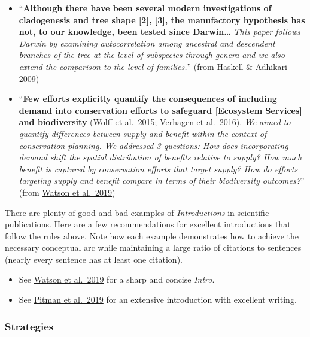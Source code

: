 \documentclass[
]{book}
\begin{document}
\begin{itemize}
\item
  ``\textbf{Although there have been several modern investigations of cladogenesis and tree shape {[}2{]}, {[}3{]}, the manufactory hypothesis has not, to our knowledge, been tested since Darwin\ldots{}} \emph{This paper follows Darwin by examining autocorrelation among ancestral and descendent branches of the tree at the level of subspecies through genera and we also extend the comparison to the level of families.}'' (from \href{https://journals.plos.org/plosone/article?id=10.1371/journal.pone.0005460}{Haskell \& Adhikari 2009})
\item
  ``\textbf{Few efforts explicitly quantify the consequences of including demand into conservation efforts to safeguard {[}Ecosystem Services{]} and biodiversity} (Wolff et al.~2015; Verhagen et al.~2016). \emph{We aimed to quantify differences between supply and benefit within the context of conservation planning. We addressed 3 questions: How does incorporating demand shift the spatial distribution of benefits relative to supply? How much benefit is captured by conservation efforts that target supply? How do efforts targeting supply and benefit compare in terms of their biodiversity outcomes?}'' (from \href{https://conbio.onlinelibrary.wiley.com/doi/full/10.1111/cobi.13276}{Watson et al.~2019})
\end{itemize}

There are plenty of good and bad examples of \emph{Introductions} in scientific publications. Here are a few recommendations for excellent introductions that follow the rules above. Note how each example demonstrates how to achieve the necessary conceptual arc while maintaining a large ratio of citations to sentences (nearly every sentence has at least one citation).

\begin{itemize}
\item
  See \href{https://conbio.onlinelibrary.wiley.com/doi/full/10.1111/cobi.13276}{Watson et al.~2019} for a sharp and concise \emph{Intro}.
\item
  See \href{https://onlinelibrary.wiley.com/doi/full/10.1111/mms.12661}{Pitman et al.~2019} for an extensive introduction with excellent writing.
\end{itemize}

\hypertarget{strategies-1}{%
\subsubsection*{Strategies}\label{strategies-1}}
\end{document}
